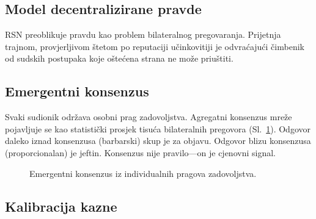 \documentclass[11pt,a4paper,twocolumn]{article}
\begin{document}
\subsection{Model decentralizirane pravde}

RSN preoblikuje pravdu kao problem bilateralnog pregovaranja. Prijetnja trajnom, provjerljivom štetom po reputaciji učinkovitiji je odvraćajući čimbenik od sudskih postupaka koje oštećena strana ne može priuštiti.

\subsection{Emergentni konsenzus}

Svaki sudionik održava osobni prag zadovoljstva. Agregatni konsenzus mreže pojavljuje se kao statistički prosjek tisuća bilateralnih pregovora (Sl.~\ref{fig:consensus}). Odgovor daleko iznad konsenzusa (barbarski) skup je za objavu. Odgovor blizu konsenzusa (proporcionalan) je jeftin. Konsenzus nije pravilo---on je cjenovni signal.

\begin{figure}[ht]
\centering
{}
\caption{Emergentni konsenzus iz individualnih pragova zadovoljstva.}
\label{fig:consensus}
\end{figure}

\subsection{Kalibracija kazne}
\end{document}
